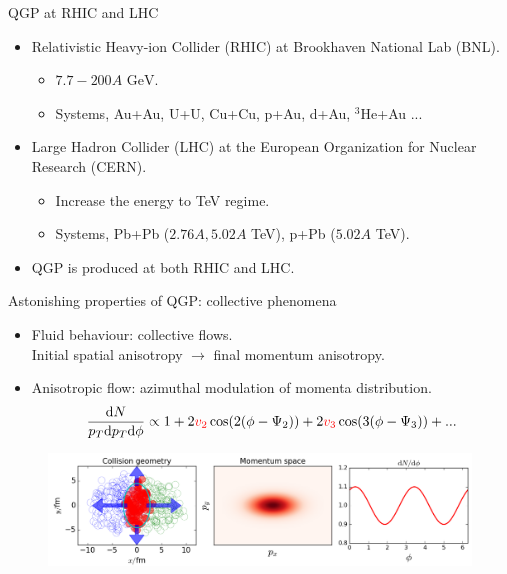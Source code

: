 \documentclass[11pt]{beamer}
\begin{document}
\begin{frame}{QGP at RHIC and LHC}
\begin{itemize}
\item Relativistic Heavy-ion Collider (RHIC) at Brookhaven National Lab (BNL).
	\begin{itemize}
	\item $7.7 - 200 A \textrm{ GeV}$.
	\item Systems, Au+Au, U+U, Cu+Cu, p+Au, d+Au, ${}^3$He+Au ... 
	\end{itemize}
\item Large Hadron Collider (LHC) at the European Organization for Nuclear Research (CERN).
	\begin{itemize}
	\item Increase the energy to TeV regime.
	\item Systems, Pb+Pb ($2.76 A, 5.02 A$ TeV), p+Pb ($5.02 A$ TeV).
	\end{itemize}
\item QGP is produced at both RHIC and LHC.
\end{itemize}
\end{frame}

\begin{frame}{Astonishing properties of QGP: collective phenomena}
\begin{itemize}
\item Fluid behaviour: collective flows. \\Initial spatial anisotropy $\rightarrow$ final momentum anisotropy.
\item Anisotropic flow: azimuthal modulation of momenta distribution.
\begin{eqnarray}
\frac{\mathrm{d}N}{p_T\mathrm{d}p_T\mathrm{d}\phi} \propto 1 + 2{\color{red} v_2} \cos(2(\phi-\Psi_2)) + 2{\color{red}v_3} \cos(3(\phi-\Psi_3)) + ...
\end{eqnarray}
\end{itemize}
\begin{center}
\begin{figure}
\includegraphics[width=\textwidth]{./pics/nuclei-less.png}
\end{figure}
\end{center}
\end{frame}
\end{document}
